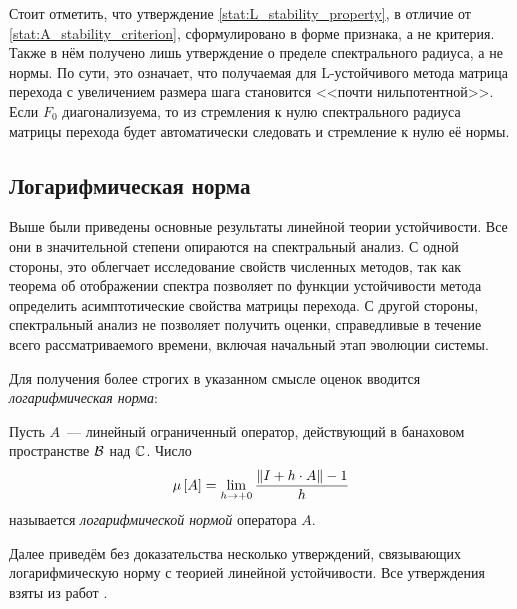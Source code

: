 Стоит отметить, что утверждение \ref{stat:L_stability_property}, в отличие от \ref{stat:A_stability_criterion}, сформулировано в форме признака, а не критерия.
Также в нём получено лишь утверждение о пределе спектрального радиуса, а не нормы.
По сути, это означает, что получаемая для L-устойчивого метода матрица перехода с увеличением размера шага становится <<почти нильпотентной>>.
Если $ F_0 $ диагонализуема, то из стремления к нулю спектрального радиуса матрицы перехода будет автоматически следовать и стремление к нулю её нормы.


\subsection{Логарифмическая норма}
\label{subsec:logarithmic_norm}

Выше были приведены основные результаты линейной теории устойчивости.
Все они в значительной степени опираются на спектральный анализ.
С одной стороны, это облегчает исследование свойств численных методов,
так как теорема об отображении спектра позволяет по функции устойчивости метода
определить асимптотические свойства матрицы перехода.
С другой стороны, спектральный анализ не позволяет получить оценки,
справедливые в течение всего рассматриваемого времени,
включая начальный этап эволюции системы.

Для получения более строгих в указанном смысле оценок вводится \emph{логарифмическая норма}:

\begin{definition}
    \label{def:logarithmic_norm}
    Пусть $ A $~--- линейный ограниченный оператор, действующий в банаховом пространстве $ \mathcal{B} $ над $ \mathbb{C} $.
    Число
    \begin{equation}
        \label{eq:logarithmic_norm}
        \mu \left[ A \right] = \lim_{h \to +0} \frac{\| I + h \cdot A \| - 1}{h}
    \end{equation}
    называется \emph{логарифмической нормой} оператора $ A $.
\end{definition}

Далее приведём без доказательства несколько утверждений,
связывающих логарифмическую норму с теорией линейной устойчивости.
Все утверждения взяты из работ \cite{soderlind2006lognorm, lambert1991methods}.

